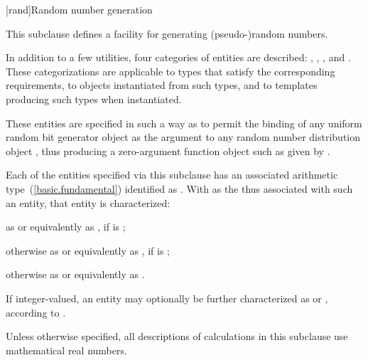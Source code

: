[rand]{Random number generation}

%
%
%
%

\pnum
This subclause defines a facility
for generating (pseudo-)random numbers.

\pnum
In addition to a few utilities,
four categories of entities are described:
,
,
,
and
.
These categorizations are applicable
to types that satisfy the corresponding requirements,
to objects instantiated from such types,
and to templates producing such types when instantiated.
\begin{note}
 These entities are specified in such a way
 as to permit the binding
 of any uniform random bit generator object 
 as the argument
 to any random number distribution object ,
 thus producing a zero-argument function object
 such as given by
 .
\end{note}

\pnum
{}%
Each of the entities specified via this subclause
has an associated arithmetic type~(\ref{basic.fundamental})
identified as .
With  as the 
thus associated with such an entity,
that entity is characterized:
\begin{enumeratea}
 \item
   as  or equivalently as ,
   if  is ;
 \item
   otherwise
   as  or equivalently as ,
   if  is ;
 \item
   otherwise
   as  or equivalently as .
\end{enumeratea}
\noindent
If integer-valued,
an entity may optionally be further characterized as
 or ,
according to .

\pnum
Unless otherwise specified,
all descriptions of calculations
in this subclause
use mathematical real numbers.

